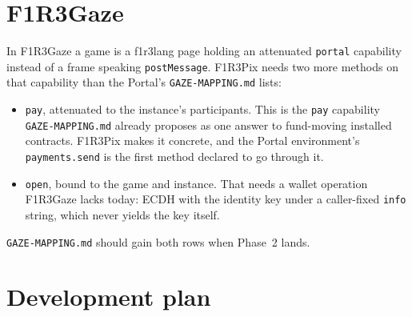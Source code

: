 \documentclass[11pt,a4paper]{article}
\newcommand{\code}[1]{\texttt{#1}}
\begin{document}
\section{F1R3Gaze}\label{sec:gaze}

In F1R3Gaze a game is a f1r3lang page holding an attenuated \code{portal} capability instead of
a frame speaking \code{postMessage}. F1R3Pix needs two more methods on that capability than the
Portal's \code{GAZE-MAPPING.md} lists:

\begin{itemize}[leftmargin=1.2em,itemsep=1pt]
\item \code{pay}, attenuated to the instance's participants. This is the \code{pay}
  capability \code{GAZE-MAPPING.md} already proposes as one answer to fund-moving installed
  contracts. F1R3Pix makes it concrete, and the Portal environment's \code{payments.send} is
  the first method declared to go through it.
\item \code{open}, bound to the game and instance. That needs a wallet operation F1R3Gaze lacks
  today: ECDH with the identity key under a caller-fixed \code{info} string, which never yields
  the key itself.
\end{itemize}
\code{GAZE-MAPPING.md} should gain both rows when Phase~2 lands.

\section{Development plan}\label{sec:plan}
\end{document}

